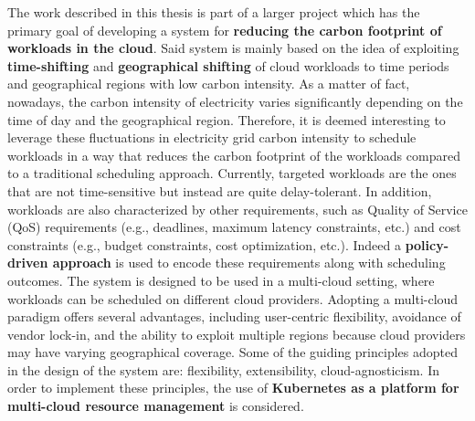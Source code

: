 The work described in this thesis is part of a larger project which has the primary goal of developing a system for \textbf{reducing the carbon footprint of workloads in the cloud}.
Said system is mainly based on the idea of exploiting \textbf{time-shifting} and \textbf{geographical shifting} of cloud workloads to time periods and geographical regions with low carbon intensity.
As a matter of fact, nowadays, the carbon intensity of electricity varies significantly depending on the time of day and the geographical region.
Therefore, it is deemed interesting to leverage these fluctuations in electricity grid carbon intensity to schedule workloads in a way that reduces the carbon footprint of the workloads compared to a traditional scheduling approach.
Currently, targeted workloads are the ones that are not time-sensitive but instead are quite delay-tolerant.
In addition, workloads are also characterized by other requirements, such as Quality of Service (QoS) requirements (e.g., deadlines, maximum latency constraints, etc.) and cost constraints (e.g., budget constraints, cost optimization, etc.).
Indeed a \textbf{policy-driven approach} is used to encode these requirements along with scheduling outcomes.
The system is designed to be used in a multi-cloud setting, where workloads can be scheduled on different cloud providers.
Adopting a multi-cloud paradigm offers several advantages, including user-centric flexibility, avoidance of vendor lock-in, and the ability to exploit multiple regions because cloud providers may have varying geographical coverage.
Some of the guiding principles adopted in the design of the system are: flexibility, extensibility, cloud-agnosticism.
In order to implement these principles, the use of \textbf{Kubernetes as a platform for multi-cloud resource management} is considered. \newline


